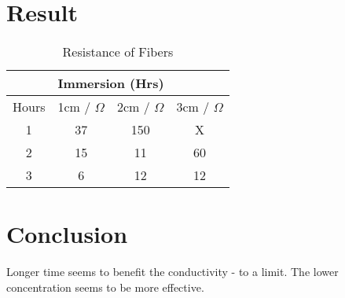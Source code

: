 \documentclass{article}
\begin{document}
\section{Result}

\begin{table}[h!]
\centering
\begin{tabular}{ |c|c|c|c| } 
 \hline
& \multicolumn{3}{l|}{Immersion (Hrs)} \\ \hline
Hours & 1cm / $\Omega$ & 2cm / $\Omega$ & 3cm / $\Omega$  \\ 
 \hline
 1  & 37& 150 & X \\ 
 2 & 15 & 11  & 60  \\ 
 3 & 6 & 12   & 12 \\ 
 \hline
\end{tabular}
 \caption{Resistance of Fibers}
\label{table:1}
\end{table}
\pagebreak
\section{Conclusion}
Longer time seems to benefit the conductivity - to a limit.
The lower concentration seems to be more effective.
\end{document}
